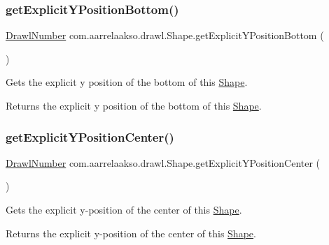 \subsubsection{\texorpdfstring{get\+Explicit\+Y\+Position\+Bottom()}{getExplicitYPositionBottom()}}
{\footnotesize\ttfamily \hyperlink{classcom_1_1aarrelaakso_1_1drawl_1_1_drawl_number}{Drawl\+Number} com.\+aarrelaakso.\+drawl.\+Shape.\+get\+Explicit\+Y\+Position\+Bottom (\begin{DoxyParamCaption}{ }\end{DoxyParamCaption})\hspace{0.3cm}{\ttfamily [protected]}}



Gets the explicit y position of the bottom of this \hyperlink{classcom_1_1aarrelaakso_1_1drawl_1_1_shape}{Shape}. 

\begin{DoxyReturn}{Returns}
the explicit y position of the bottom of this \hyperlink{classcom_1_1aarrelaakso_1_1drawl_1_1_shape}{Shape}. 
\end{DoxyReturn}
\mbox{\label{classcom_1_1aarrelaakso_1_1drawl_1_1_shape_a602cb73f783f2856fa81e82bf7792263}} 
\subsubsection{\texorpdfstring{get\+Explicit\+Y\+Position\+Center()}{getExplicitYPositionCenter()}}
{\footnotesize\ttfamily \hyperlink{classcom_1_1aarrelaakso_1_1drawl_1_1_drawl_number}{Drawl\+Number} com.\+aarrelaakso.\+drawl.\+Shape.\+get\+Explicit\+Y\+Position\+Center (\begin{DoxyParamCaption}{ }\end{DoxyParamCaption})\hspace{0.3cm}{\ttfamily [protected]}}



Gets the explicit y-\/position of the center of this \hyperlink{classcom_1_1aarrelaakso_1_1drawl_1_1_shape}{Shape}. 

\begin{DoxyReturn}{Returns}
the explicit y-\/position of the center of this \hyperlink{classcom_1_1aarrelaakso_1_1drawl_1_1_shape}{Shape}. 
\end{DoxyReturn}
\mbox{\label{classcom_1_1aarrelaakso_1_1drawl_1_1_shape_a95f8a2f107299d91813627a95b3e0f0f}} 
